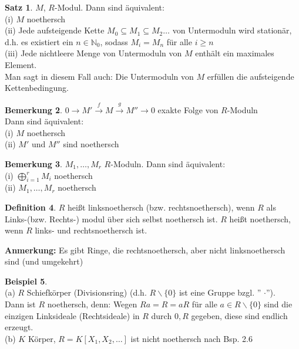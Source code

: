 \documentclass[10pt,a4paper,numbers=endperiod]{scrreprt}
\theoremstyle{definition}
\newtheorem{satz}{Satz}[section]
\newtheorem{defi}[satz]{Definition}
\newtheorem{bem}[satz]{Bemerkung}
\newtheorem{bsp}[satz]{Beispiel}
\def\NN{{\mathbb N}}
\begin{document}
\begin{satz}
	$M$, $R$-Modul. Dann sind äquivalent:\\
	(i) $M$ noethersch\\
	(ii) Jede aufsteigende Kette $M_0 \subseteq M_1 \subseteq M_2 \ldots$ von Untermoduln wird stationär, d.h. es existiert ein $n \in \NN_0$, sodass $M_i = M_n$ für alle $i \geq n$\\
	(iii) Jede nichtleere Menge von Untermoduln von $M$ enthält ein maximales Element.\\
	Man sagt in diesem Fall auch: Die Untermoduln von $M$ erfüllen die aufsteigende Kettenbedingung.\\
\end{satz}

\begin{bem}
	$0 \rightarrow M' \overset{f}{\rightarrow} M \overset{g}{\rightarrow} M'' \rightarrow 0$ exakte Folge von $R$-Moduln\\
	Dann sind äquivalent:\\
	(i) $M$ noethersch\\
	(ii) $M'$ und $M''$ sind noethersch
\end{bem}

\begin{bem}
	$M_1, \ldots, M_r$ $R$-Moduln. Dann sind äquivalent:\\
	(i) $\bigoplus\limits_{i = 1}^r M_i$ noethersch\\
	(ii) $M_1, \ldots, M_r$ noethersch
\end{bem}

\begin{defi}
	$R$ heißt linksnoethersch (bzw. rechtsnoethersch), wenn $R$ als Links-(bzw. Rechts-) modul über sich selbst noethersch ist. $R$ heißt noethersch, wenn $R$ links- und rechtsnoethersch ist.
\end{defi}

\textbf{Anmerkung:} Es gibt Ringe, die rechtsnoethersch, aber nicht linksnoethersch sind (und umgekehrt)

\begin{bsp}
	$ $\\
	(a) $R$ Schiefkörper (Divisionsring) (d.h. $R \backslash \{0\}$ ist eine Gruppe bzgl. '' $\cdot$'').\\
	Dann ist $R$ noethersch, denn: Wegen $Ra = R = aR$ für alle $a \in R \backslash \{0\}$ sind die einzigen Linksideale (Rechtsideale) in $R$ durch $0, R$ gegeben, diese sind endlich erzeugt.\\
	(b) $K$ Körper, $R = K[X_1, X_2, \ldots]$ ist nicht noethersch nach Bsp. 2.6
\end{bsp}
\end{document}
